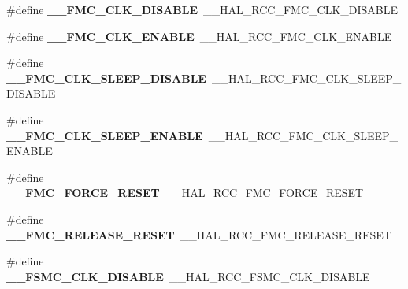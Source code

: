 \begin{DoxyCompactItemize}
\item 
\#define {\bfseries \+\_\+\+\_\+\+F\+M\+C\+\_\+\+C\+L\+K\+\_\+\+D\+I\+S\+A\+B\+LE}~\+\_\+\+\_\+\+H\+A\+L\+\_\+\+R\+C\+C\+\_\+\+F\+M\+C\+\_\+\+C\+L\+K\+\_\+\+D\+I\+S\+A\+B\+LE\hypertarget{group___h_a_l___r_c_c___aliased_ga22c7b77b26a0507b21fe61a4e2db31e3}{}\label{group___h_a_l___r_c_c___aliased_ga22c7b77b26a0507b21fe61a4e2db31e3}

\item 
\#define {\bfseries \+\_\+\+\_\+\+F\+M\+C\+\_\+\+C\+L\+K\+\_\+\+E\+N\+A\+B\+LE}~\+\_\+\+\_\+\+H\+A\+L\+\_\+\+R\+C\+C\+\_\+\+F\+M\+C\+\_\+\+C\+L\+K\+\_\+\+E\+N\+A\+B\+LE\hypertarget{group___h_a_l___r_c_c___aliased_ga407951f6eb69ea219ae97f4e00c1b0b0}{}\label{group___h_a_l___r_c_c___aliased_ga407951f6eb69ea219ae97f4e00c1b0b0}

\item 
\#define {\bfseries \+\_\+\+\_\+\+F\+M\+C\+\_\+\+C\+L\+K\+\_\+\+S\+L\+E\+E\+P\+\_\+\+D\+I\+S\+A\+B\+LE}~\+\_\+\+\_\+\+H\+A\+L\+\_\+\+R\+C\+C\+\_\+\+F\+M\+C\+\_\+\+C\+L\+K\+\_\+\+S\+L\+E\+E\+P\+\_\+\+D\+I\+S\+A\+B\+LE\hypertarget{group___h_a_l___r_c_c___aliased_ga9e6ab3878854d53e5d689782e0da6c12}{}\label{group___h_a_l___r_c_c___aliased_ga9e6ab3878854d53e5d689782e0da6c12}

\item 
\#define {\bfseries \+\_\+\+\_\+\+F\+M\+C\+\_\+\+C\+L\+K\+\_\+\+S\+L\+E\+E\+P\+\_\+\+E\+N\+A\+B\+LE}~\+\_\+\+\_\+\+H\+A\+L\+\_\+\+R\+C\+C\+\_\+\+F\+M\+C\+\_\+\+C\+L\+K\+\_\+\+S\+L\+E\+E\+P\+\_\+\+E\+N\+A\+B\+LE\hypertarget{group___h_a_l___r_c_c___aliased_ga1a8e1503902302cc5db2c8991e94d1d5}{}\label{group___h_a_l___r_c_c___aliased_ga1a8e1503902302cc5db2c8991e94d1d5}

\item 
\#define {\bfseries \+\_\+\+\_\+\+F\+M\+C\+\_\+\+F\+O\+R\+C\+E\+\_\+\+R\+E\+S\+ET}~\+\_\+\+\_\+\+H\+A\+L\+\_\+\+R\+C\+C\+\_\+\+F\+M\+C\+\_\+\+F\+O\+R\+C\+E\+\_\+\+R\+E\+S\+ET\hypertarget{group___h_a_l___r_c_c___aliased_gacd251c599d336a530f707c25f999a639}{}\label{group___h_a_l___r_c_c___aliased_gacd251c599d336a530f707c25f999a639}

\item 
\#define {\bfseries \+\_\+\+\_\+\+F\+M\+C\+\_\+\+R\+E\+L\+E\+A\+S\+E\+\_\+\+R\+E\+S\+ET}~\+\_\+\+\_\+\+H\+A\+L\+\_\+\+R\+C\+C\+\_\+\+F\+M\+C\+\_\+\+R\+E\+L\+E\+A\+S\+E\+\_\+\+R\+E\+S\+ET\hypertarget{group___h_a_l___r_c_c___aliased_gaafeb1568456dc0cfe7b305b98f4ee9a2}{}\label{group___h_a_l___r_c_c___aliased_gaafeb1568456dc0cfe7b305b98f4ee9a2}

\item 
\#define {\bfseries \+\_\+\+\_\+\+F\+S\+M\+C\+\_\+\+C\+L\+K\+\_\+\+D\+I\+S\+A\+B\+LE}~\+\_\+\+\_\+\+H\+A\+L\+\_\+\+R\+C\+C\+\_\+\+F\+S\+M\+C\+\_\+\+C\+L\+K\+\_\+\+D\+I\+S\+A\+B\+LE\hypertarget{group___h_a_l___r_c_c___aliased_ga2e6fc3790a97821d4677d08212326dd0}{}\label{group___h_a_l___r_c_c___aliased_ga2e6fc3790a97821d4677d08212326dd0}


\end{DoxyCompactItemize}
